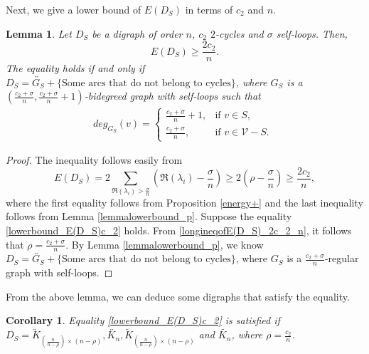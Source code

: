 \documentclass[12pt,a4paper,reqno]{amsart}
\numberwithin{equation}{section}
\theoremstyle{plain}
\newtheorem{lemma}[theorem]{Lemma}
\newtheorem{corollary}[theorem]{Corollary}
\theoremstyle{definition}
\newcommand{\<}{\langle}
\renewcommand{\>}{\rangle}
\newcommand{\cV}{{\mathcal V}}
\begin{document}
    Next, we give a lower bound of $E(D_S)$ in terms of $c_2$ and $n$. 
    \begin{lemma}
    \label{lemma_lower_bound_E(D_S)_c_2}
        Let $D_S$ be a digraph of order $n$, $c_2$ $2$-cycles and $\sigma$ self-loops. Then, 
        \begin{equation}
        \label{lowerbound_E(D_S)c_2}
            E(D_S)\geq \frac{2c_2}{n}. 
        \end{equation}
        The equality holds if and only if $D_S=\overleftrightarrow{G_S}+ \text{\{Some arcs that do not belong to cycles\}}$, where  $G_S$ is a $(\frac{c_2+\sigma}{n},\frac{c_2+\sigma}{n}+1) $-bidegreed graph with self-loops such that
        \begin{align*}
            deg_{G_S}(v)= 
            \begin{cases}
	\frac{c_2+\sigma}{n}+1, &\text{if $v \in S$},\\
	\frac{c_2+\sigma}{n}, &\text{if $v \in \cV-S$. }
    \end{cases}
        \end{align*}
    \end{lemma}

    \begin{proof}
        The inequality follows easily from 
        \begin{equation}
            \label{longineqofE(D_S)_2c_2_n}
            E(D_S)=2\sum_{\Re(\lambda_i) > \frac{\sigma}{n}} \left( \Re(\lambda_i)-\frac{\sigma}{n} \right) \geq 2 \left(\rho-\frac{\sigma}{n} \right) \geq \frac{2c_2}{n},
        \end{equation}
        where the first equality follows from Proposition \ref{energy+} and the last inequality follows from Lemma \ref{lemmalowerbound_p}. Suppose the equality \eqref{lowerbound_E(D_S)c_2} holds. From \eqref{longineqofE(D_S)_2c_2_n}, it follows that $\rho =\frac{c_2+\sigma}{n}$. By Lemma  \ref{lemmalowerbound_p}, we know $D_S=\overleftrightarrow{G_S}+ \text{\{Some arcs that do not belong to cycles\}}$, where $G_S$ is a $\frac{c_2+\sigma}{n}$-regular graph with self-loops.
    \end{proof}

From the above lemma, we can deduce some digraphs that satisfy the equality.
    \begin{corollary}
        Equality \eqref{lowerbound_E(D_S)c_2} is satisfied if $D_S=\overleftrightarrow{K}_{(\frac{n}{n-\rho}) \times (n-\rho)}, \overleftrightarrow{K_n}, \widetilde{K}_{(\frac{n}{n-\rho}) \times (n-\rho)}$ and $\widetilde{K_n}$, where $\rho=\frac{c_2}{n}$.
    \end{corollary}
\end{document}
